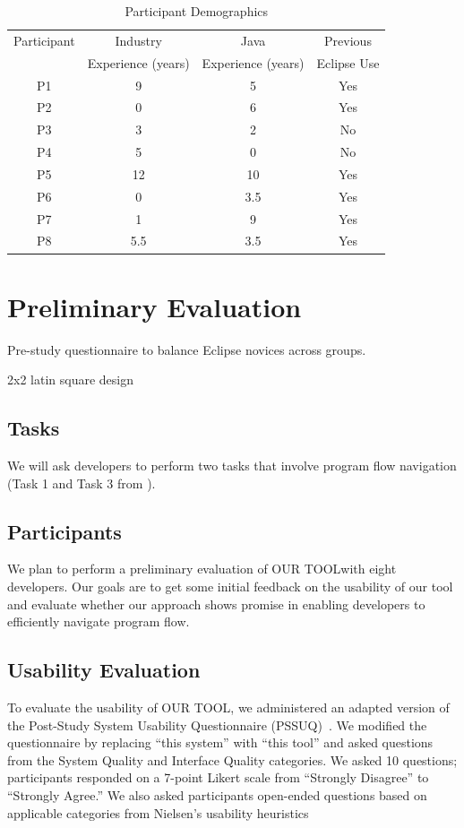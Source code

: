 \documentclass[conference]{IEEEtran}
\newcommand{\toolName}{OUR TOOL}
\begin{document}
\begin{table}
\centering
\caption{Participant Demographics}
\begin{tabular}{|c|c|c|c|}
\hline
Participant & Industry & Java &\multicolumn{1}{c|}{Previous} \\
& Experience (years) & Experience (years) & \multicolumn{1}{c|}{Eclipse Use} \\
\hline
P1 & 9 & 5 & Yes \\
\hline
P2 & 0 & 6 & Yes \\
\hline
P3 & 3 & 2 & No \\
\hline
P4 & 5 & 0 & No \\
\hline
P5 & 12 & 10 & Yes \\
\hline
P6 & 0 & 3.5 & Yes \\
\hline
P7 & 1 & 9 & Yes \\
\hline
P8 & 5.5 & 3.5 & Yes \\
\hline
\end{tabular}
\label{table:participants}
\end{table}

\section{Preliminary Evaluation}

Pre-study questionnaire to balance Eclipse novices across groups.

2x2 latin square design


\subsection{Tasks}
We will ask developers to perform two tasks that involve program flow navigation (Task 1 and Task 3 from \cite{Smith2015}).

\subsection{Participants}
We plan to perform a preliminary evaluation of \toolName with eight developers.
Our goals are to get some initial feedback on the usability of our tool and evaluate whether our approach shows promise in enabling developers to efficiently navigate program flow. 

\subsection{Usability Evaluation}
To evaluate the usability of \toolName, we administered an adapted version of the Post-Study System Usability Questionnaire (PSSUQ)~\cite{Lewis95ibmcomputer}. We modified the questionnaire by replacing ``this system'' with ``this tool'' and asked questions from the System Quality and Interface Quality categories. We asked 10 questions; participants responded on a 7-point Likert scale from ``Strongly Disagree'' to ``Strongly Agree.'' 	
We also asked participants open-ended questions based on applicable categories from Nielsen's usability heuristics~\cite{Nielsen1992}
\end{document}
